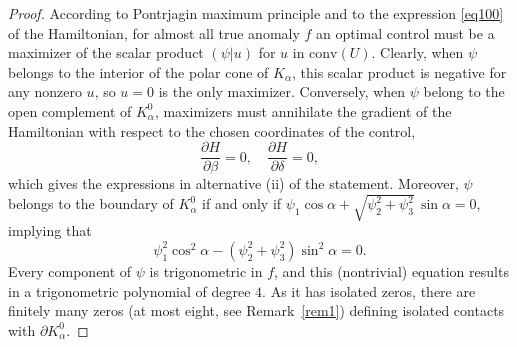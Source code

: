 \documentclass[AMA,STIX1COL]{WileyNJD-v2}
\newcommand{\conv}{\text{conv}}
\begin{document}
\begin{proof}
According to Pontrjagin maximum principle and to the expression \eqref{eq100} of the Hamiltonian,
for almost all true anomaly $f$ an optimal control must be a maximizer of the scalar product
$(\psi|u)$
for $u$ in $\conv(U)$. Clearly, when $\psi$ belongs to the interior of the polar cone of $K_\alpha$,
this scalar product is negative for any nonzero $u$, so $u=0$ is the only maximizer.
Conversely, when $\psi$ belong to the open complement of $K_\alpha^0$, maximizers must annihilate the
gradient of the Hamiltonian with respect to the chosen coordinates of the control,
$$ \frac{\partial H}{\partial\beta} = 0,\quad \frac{\partial H}{\partial\delta} = 0, $$
which gives the expressions in alternative (ii) of the statement. Moreover, $\psi$ belongs to the boundary
of $K_\alpha^0$ if and only if
$\psi_1\cos\alpha + \sqrt{\psi_2^2+\psi_3^2}\,\sin\alpha = 0$,
implying that
\begin{equation} \label{eq103}
  \psi_1^2\cos^2\alpha - (\psi_2^2+\psi_3^2)\sin^2\alpha = 0.
\end{equation}
Every component of $\psi$ is trigonometric in $f$, and this (nontrivial) equation results in a
trigonometric polynomial of degree $4$. As it has isolated zeros, there are finitely many zeros (at most
eight, see Remark~\ref{rem1}) defining isolated contacts with $\partial K_\alpha^0$.
\end{proof}
\end{document}
